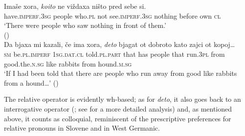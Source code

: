 \documentclass[output=paper]{langscibook}
\begin{document}
\ea \label{bacsk:ex:bulgariancorp}
\ea \gll Imaše xora, \textit{koito} ne viždaxa ništo pred sebe si.\\
have.\textsc{imperf.3sg} people who.\textsc{pl} not see.\textsc{imperf.3sg} nothing before own \textsc{cl}\\
\glt `There were people who saw nothing in front of them.'\\ \hfill(\citealt[249]{buzarovska2009})\\
\ex \gll Da bjaxa mi kazali, \v{c}e ima xora, \textit{deto} bjagat ot dobroto kato zajci ot kopoj\ldots{}\\
\textsc{sm} be.\textsc{pl.imperf} \textsc{1sg.dat.cl} told.\textsc{pl.part} that has people that run.\textsc{3pl} from good.the.\textsc{n.sg} like rabbits from hound.\textsc{m.sg}\\
\glt `If I had been told that there are people who run away from good like rabbits from a hound\ldots{}' \hfill (\citealt[249]{buzarovska2009})
\z
\z

\noindent The relative operator is evidently wh-based; as for \textit{deto}, it also goes back to an interrogative operator (\citealt[234]{buzarovska2009}; see \citealt[1241]{krapova2010} for a more detailed analysis) and, as mentioned above, it counts as colloquial, reminiscent of the prescriptive preferences for relative pronouns in Slovene and in West Germanic.
\end{document}
